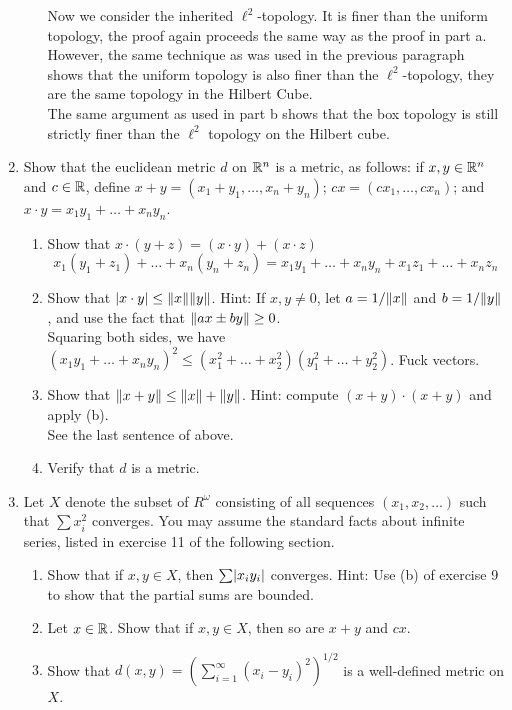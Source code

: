 \documentclass[12pt,letterpaper]{article}
\begin{document}
\begin{enumerate}
\begin{enumerate}
    Now we consider the inherited $\ell^2$-topology. It is finer than the uniform topology, the proof again proceeds the same way as the proof in part a. However, the same technique as was used in the previous paragraph shows that the uniform topology is also finer than the $\ell^2$-topology, they are the same topology in the Hilbert Cube.\\
    The same argument as used in part b shows that the box topology is still strictly finer than the $\ell^2$ topology on the Hilbert cube.
  \end{enumerate}
  \item Show that the euclidean metric $d$ on $\mathbb{R}^n$ is a metric, as follows: if $x,y\in \mathbb{R}^n$ and $c\in \mathbb{R}$, define $x+y=(x_1+y_1,\dots,x_n+y_n)$; $cx = (cx_1, \dots, cx_n)$; and $x\cdot y = x_1y_1 + \dots + x_ny_n$.\begin{enumerate}
    \item Show that $x\cdot (y+z) = (x\cdot y) + (x\cdot z)$
    $$x_1(y_1+z_1)+\dots + x_n(y_n+z_n) = x_1y_1+\dots+x_ny_n + x_1z_1+\dots+x_nz_n$$
    \item Show that $\lvert x\cdot y\rvert \leq \lVert x\rVert\lVert y\rVert$. Hint: If $x,y \neq 0$, let $a=1/\lVert x\rVert$ and $b=1/\lVert y\rVert$, and use the fact that $\lVert ax\pm by\rVert \geq 0$. \\
    Squaring both sides, we have $(x_1y_1 + \dots + x_ny_n)^2 \leq (x_1^2+\dots+x_2^2)(y_1^2+\dots+y_2^2)$. Fuck vectors. \\
    \item Show that $\lVert x+y\rVert \leq \lVert x\rVert + \lVert y\rVert$. Hint: compute $(x+y)\cdot(x+y)$ and apply (b). \\
    See the last sentence of above.
    \item Verify that $d$ is a metric.
  \end{enumerate}
  \item Let $X$ denote the subset of $R^\omega$ consisting of all sequences $(x_1,x_2,\dots)$ such that $\sum x_i^2$ converges. You may assume the standard facts about infinite series, listed in exercise 11 of the following section. \begin{enumerate}
    \item Show that if $x,y\in X$, then $\sum \lvert x_iy_i\rvert$ converges. Hint: Use (b) of exercise 9 to show that the partial sums are bounded.
    \item Let $x\in \mathbb{R}$. Show that if $x,y\in X$, then so are $x+y$ and $cx$. \\
    \item Show that $d(x,y) = \left(\displaystyle\sum_{i=1}^\infty(x_i-y_i)^2\right)^{1/2}$ is a well-defined metric on $X$.

\end{enumerate}
\end{enumerate}
\end{document}
